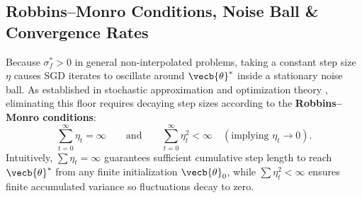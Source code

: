 \documentclass[../../../../master.tex]{subfiles}
\begin{document}
\subsection{Robbins--Monro Conditions, Noise Ball \& Convergence Rates}
\label{sec:sgd:robbins-monro}

Because $\sigma_f^* > 0$ in general non-interpolated problems, taking a constant step size $\eta$ causes SGD iterates to oscillate around $\vecb{\theta}^*$ inside a stationary noise ball. As established in stochastic approximation  and optimization theory , eliminating this floor requires decaying step sizes according to the \textbf{Robbins--Monro conditions}:
\begin{equation}
\label{eq:sgd:robbins-monro}
\sum_{t=0}^{\infty} \eta_t = \infty \qquad \text{and} \qquad \sum_{t=0}^{\infty} \eta_t^2 < \infty \quad (\text{implying } \eta_t \to 0).
\end{equation}
Intuitively, $\sum \eta_t = \infty$ guarantees sufficient cumulative step length to reach $\vecb{\theta}^*$ from any finite initialization $\vecb{\theta}_0$, while $\sum \eta_t^2 < \infty$ ensures finite accumulated variance so fluctuations decay to zero.
\end{document}

